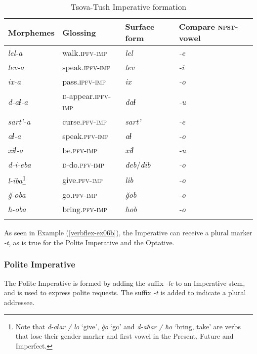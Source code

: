 \begin{table}
\begin{tabular}{llll}
\lsptoprule
	Morphemes & Glossing & Surface form & Compare \textsc{npst}-vowel\\
\midrule
	\textit{lel-a} & walk.\textsc{ipfv-imp} & \textit{lel} & \textit{-e} \\
	\textit{lev-a} & speak.\textsc{ipfv-imp} & \textit{lev} & \textit{-i}\\
	\textit{ix-a} & pass.\textsc{ipfv-imp} & \textit{ix} & \textit{-o}\\
	\textit{d-aɬ-a} & \textsc{d}-appear.\textsc{ipfv-imp} & \textit{daɬ} & \textit{-u} \\
\midrule
	\textit{sart'-a} & curse.\textsc{pfv-imp} & \textit{sart'} & \textit{-e} \\
	\textit{aɬ-a} & speak.\textsc{pfv-imp} &  \textit{aɬ} & \textit{-o} \\
	\textit{xiɬ-a} & be.\textsc{pfv-imp} & \textit{xiɬ} & \textit{-u }\\
\midrule
	\textit{d-i-eba} & \textsc{d}-do\textsc{.pfv-imp} & \textit{deb}/\textit{dib} & \textit{-o} \\
	\textit{l-iba}\footnote{Note that \textit{d-aɬar / lo} `give', \textit{\u{g}o} `go' and \textit{d-aħar / ħo} `bring, take' are verbs that lose their gender marker and first vowel in the Present, Future and Imperfect.} & give.\textsc{pfv-imp} & \textit{lib} & \textit{-o} \\
	\textit{\u{g}-oba} & go.\textsc{pfv-imp} & \textit{\u{g}ob} & \textit{-o} \\
	\textit{ħ-oba} & bring.\textsc{pfv-imp} & \textit{ħob} & \textit{-o} \\ 
\lspbottomrule
\end{tabular}
\caption{Tsova-Tush Imperative formation}
\label{TAME-table4}
\end{table}

As seen in Example (\ref{verbflex-ex06b}), the Imperative can receive a plural marker \textit{-t}, as is true for the Polite Imperative and the Optative.

\subsubsection{Polite Imperative}
\largerpage[2]

The Polite Imperative is formed by adding the suffix \textit{-le} to an Imperative stem, and is used to express polite requests. The suffix \textit{-t} is added to indicate a plural addressee.

